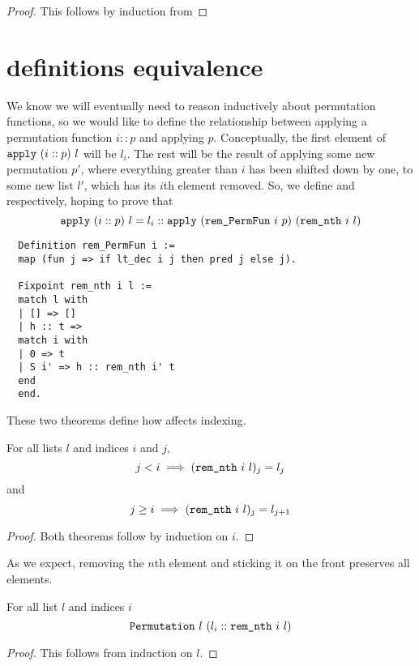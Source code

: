 \documentclass[sigplan,10pt,anonymous,review]{thesis}
\begin{document}
\hdsortsortedS*
\begin{proof}
  This follows by induction from 
\end{proof}

\section{ definitions equivalence}
\label{appendix:perm_def_eq}

We know we will eventually need to reason inductively about
permutation functions, so we would like to define the relationship
between applying a permutation function $i :: p$ and applying $p$.
Conceptually, the first element of $\texttt{\textup{apply}}~(i::p)~l$ will be
$l_i$. The rest will be the result of applying some new permutation
$p'$, where everything greater than $i$ has been shifted down by one,
to some new list $l'$, which has its $i$th element removed. So, we
define  and  respectively, hoping to
prove that
\begin{equation*}
  \texttt{\textup{apply}}~(i::p)~l =
  l_i :: \texttt{\textup{apply}}~(\texttt{\textup{rem\_PermFun}}~i~p)~(\texttt{\textup{rem\_nth}}~i~l)
\end{equation*}
\begin{lstlisting}
  Definition rem_PermFun i :=
  map (fun j => if lt_dec i j then pred j else j).

  Fixpoint rem_nth i l :=
  match l with
  | [] => []
  | h :: t =>
  match i with
  | 0 => t
  | S i' => h :: rem_nth i' t
  end
  end.
\end{lstlisting}

These two theorems define how  affects indexing.
\begin{theorem}
  For all lists $l$ and indices $i$ and $j$,
  \begin{equation*}
    j < i \implies (\texttt{\textup{rem\_nth}}~i~l)_j = l_j
  \end{equation*}
  and
  \begin{equation*}
    j \ge i \implies (\texttt{\textup{rem\_nth}}~i~l)_j = l_{j+1}
  \end{equation*}
\end{theorem}
\begin{proof}
  Both theorems follow by induction on $i$.
\end{proof}

As we expect, removing the $n$th element and sticking it on the front
preserves all elements.
\begin{theorem}
  For all list $l$ and indices $i$
  \begin{equation*}
    \texttt{\textup{Permutation}}~l~(l_i :: \texttt{\textup{rem\_nth}}~i~l)
  \end{equation*}
\end{theorem}
\begin{proof}
  This follows from induction on $l$.
\end{proof}
\end{document}
